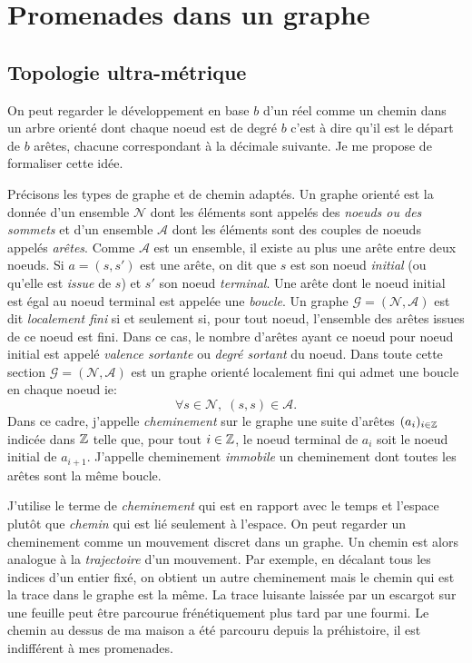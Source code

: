 \section{Promenades dans un graphe}\label{Sec:PromGraph}

\subsection{Topologie ultra-métrique}
On peut regarder le développement en base $b$ d'un réel comme un chemin dans un arbre orienté dont chaque noeud est de degré $b$ c'est à dire qu'il est le départ de $b$ arêtes, chacune correspondant à la \og décimale\fg{} suivante. Je me propose de formaliser cette idée. 

\noindent Précisons les types de graphe et de chemin adaptés.\newline
Un graphe orienté est la donnée d'un ensemble $\mathcal{N}$ dont les éléments sont appelés des \emph{noeuds ou des sommets} et d'un ensemble $\mathcal{A}$ dont les éléments sont des couples de noeuds appelés \emph{arêtes}. Comme $\mathcal{A}$ est un ensemble, il existe au plus une arête entre deux noeuds.\newline
Si $a=(s,s')$ est une arête, on dit que $s$ est son noeud \emph{initial} (ou qu'elle est \emph{issue} de $s$) et $s'$ son noeud \emph{terminal}. Une arête dont le noeud initial est égal au noeud terminal est appelée une \emph{boucle}.\newline
Un graphe $\mathcal{G} = (\mathcal{N}, \mathcal{A})$ est dit \emph{localement fini} si et seulement si, pour tout noeud, l'ensemble des arêtes issues de ce noeud est fini. Dans ce cas, le nombre d'arêtes ayant ce noeud pour noeud initial est appelé \emph{valence sortante} ou \emph{degré sortant} du noeud.\newline
Dans toute cette section $\mathcal{G} = (\mathcal{N}, \mathcal{A})$ est un graphe orienté localement fini qui admet une boucle en chaque noeud ie:
\begin{displaymath}
 \forall s \in \mathcal{N}, \; (s,s) \in \mathcal{A}.
\end{displaymath}
Dans ce cadre, j'appelle \emph{cheminement} sur le graphe une suite d'arêtes $(a_i)_{i\in\mathbb{Z}}$ indicée dans $\mathbb{Z}$ telle que, pour tout $i\in \mathbb{Z}$, le noeud terminal de $a_i$ soit le noeud initial de $a_{i+1}$. J'appelle cheminement \emph{immobile} un cheminement dont toutes les arêtes sont la même boucle.
\begin{rem}
 J'utilise le terme de \emph{cheminement} qui est en rapport avec le temps et l'espace plutôt que \emph{chemin} qui est lié seulement à l'espace. On peut regarder un cheminement comme un mouvement discret dans un graphe. Un chemin est alors analogue à la \emph{trajectoire} d'un mouvement. Par exemple, en décalant tous les indices d'un entier fixé, on obtient un autre cheminement mais le chemin qui est la trace dans le graphe est la même. La trace luisante laissée par un escargot sur une feuille peut être parcourue frénétiquement plus tard par une fourmi. Le chemin au dessus de ma maison a été parcouru depuis la préhistoire, il est indifférent à mes promenades.
\end{rem}
